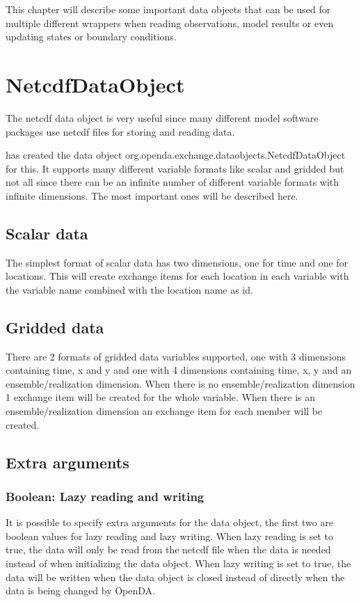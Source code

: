 
This chapter will describe some important data objects that can be used for multiple different wrappers when reading observations, model results or even updating states or boundary conditions.

\section{NetcdfDataObject}

The netcdf data object is very useful since many different model software packages use netcdf files for storing and reading data.

\oda has created the data object org.openda.exchange.dataobjects.NetcdfDataObject for this.
It supports many different variable formats like scalar and gridded but not all since there can be an infinite number of different variable formats with infinite dimensions.
The most important ones will be described here.

\subsection{Scalar data}

The simplest format of scalar data has two dimensions, one for time and one for locations.
This will create exchange items for each location in each variable with the variable name combined with the location name as id.

\subsection{Gridded data}
There are 2 formats of gridded data variables supported, one with 3 dimensions containing time, x and y and one with 4 dimensions containing time, x, y and an ensemble/realization dimension. When there is no ensemble/realization dimension 1 exchange item will be created for the whole variable. 
When there is an ensemble/realization dimension an exchange item for each member will be created.

\subsection{Extra arguments}

\subsubsection{Boolean: Lazy reading and writing}
It is possible to specify extra arguments for the data object, the first two are boolean values for lazy reading and lazy writing.
When lazy reading is set to true, the data will only be read from the netcdf file when the data is needed instead of when initializing the data object.
When lazy writing is set to true, the data will be written when the data object is closed instead of directly when the data is being changed by OpenDA.

